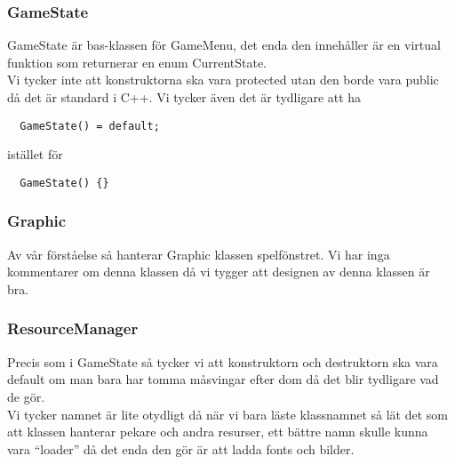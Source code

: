 \documentclass{TDP003mall}
\begin{document}
\subsubsection{GameState}
GameState är bas-klassen för GameMenu, det enda den innehåller är en virtual funktion som returnerar en enum CurrentState. \\
Vi tycker inte att konstruktorna ska vara protected utan den borde vara public då det är standard i C++. Vi tycker även det är tydligare att ha \\
\begin{frame}[Kod]
\begin{lstlisting}
  GameState() = default;
\end{lstlisting}
\end{frame}
istället för \\
\begin{frame}[Kod]
\begin{lstlisting}
  GameState() {}
\end{lstlisting}
\end{frame}

\subsubsection{Graphic}
Av vår förståelse så hanterar Graphic klassen spelfönstret. Vi har inga kommentarer om denna klassen då vi tygger att designen av denna klassen är bra.

\subsubsection{ResourceManager}
Precis som i GameState så tycker vi att konstruktorn och destruktorn ska vara default om man bara har tomma måsvingar efter dom då det blir tydligare vad de gör. \\
Vi tycker namnet är lite otydligt då när vi bara läste klassnamnet så lät det som att klassen hanterar pekare och andra resurser, ett bättre namn skulle kunna vara ``loader'' då det enda den gör är att ladda fonts och bilder.
\end{document}
